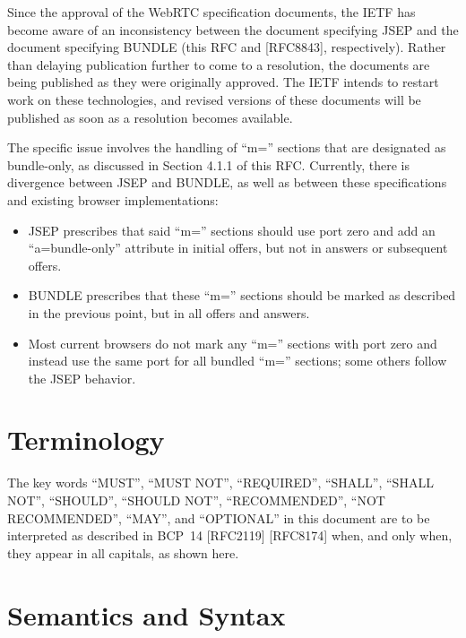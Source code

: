 \documentclass{article}
\begin{document}
Since the approval of the WebRTC specification documents, the IETF
has become aware of an inconsistency between the document specifying
JSEP and the document specifying BUNDLE (this RFC and [RFC8843],
respectively).  Rather than delaying publication further to come to a
resolution, the documents are being published as they were originally
approved.  The IETF intends to restart work on these technologies,
and revised versions of these documents will be published as soon as
a resolution becomes available.

The specific issue involves the handling of ``m='' sections that are
designated as bundle-only, as discussed in Section 4.1.1 of this RFC.
Currently, there is divergence between JSEP and BUNDLE, as well as
between these specifications and existing browser implementations:

\begin{itemize}
  \item JSEP prescribes that said ``m='' sections should use port zero and
    add an ``a=bundle-only'' attribute in initial offers, but not in
    answers or subsequent offers.

  \item BUNDLE prescribes that these ``m='' sections should be marked as
    described in the previous point, but in all offers and answers.

  \item Most current browsers do not mark any ``m='' sections with port zero
    and instead use the same port for all bundled ``m='' sections; some
    others follow the JSEP behavior.
\end{itemize}

\section{Terminology}

The key words ``MUST'', ``MUST NOT'', ``REQUIRED'', ``SHALL'', ``SHALL NOT'',
``SHOULD'', ``SHOULD NOT'', ``RECOMMENDED'', ``NOT RECOMMENDED'', ``MAY'', and
``OPTIONAL'' in this document are to be interpreted as described in
BCP~14 [RFC2119] [RFC8174] when, and only when, they appear in all
capitals, as shown here.

\section{Semantics and Syntax}
\end{document}
